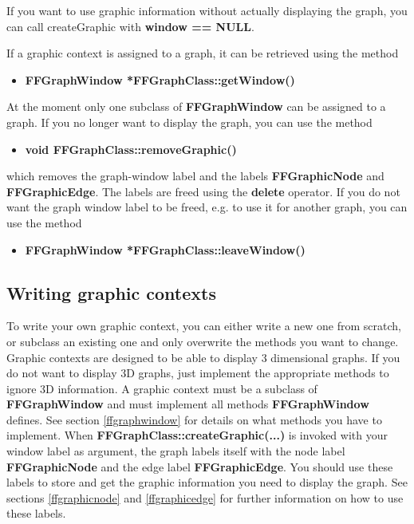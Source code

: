 If you want to use graphic information without actually
displaying the graph, you can call createGraphic with {\bf window
  == NULL}.

If a graphic context is assigned to a graph, it can be retrieved
using the method\\

\begin{itemize}
\item{\bf FFGraphWindow *FFGraphClass::getWindow()}\\
\end{itemize}

At the moment only one subclass of {\bf FFGraphWindow} can be assigned
to a graph. If you no longer want to display the graph, you can use the
method\\

\begin{itemize}
\item{\bf void FFGraphClass::removeGraphic()}\\
\end{itemize}

which removes the graph-window label and the labels {\bf FFGraphicNode}
and {\bf FFGraphicEdge}. The labels are freed using the {\bf delete}
operator. If you do not want the graph window label to be freed, e.g. to
use it for another graph, you can use the method\\

\begin{itemize}
\item{\bf FFGraphWindow *FFGraphClass::leaveWindow()}\\
\end{itemize}

\subsection{Writing graphic contexts}
\label{writing_graphic}

To write your own graphic context, you can either write a new one from
scratch, or subclass an existing one and only overwrite the methods you
want to change. Graphic contexts are designed to be able to display 3
dimensional graphs. If you do not want to display 3D graphs, just
implement the appropriate methods to ignore 3D information.  A graphic
context must be a subclass of {\bf FFGraphWindow} and must implement all
methods {\bf FFGraphWindow} defines.  See section \vref{ffgraphwindow}
for details on what methods you have to implement. When {\bf
  FFGraphClass::createGraphic(...)} is invoked with your window label as
argument, the graph labels itself with the node label {\bf
  FFGraphicNode} and the edge label {\bf FFGraphicEdge}. You should use
these labels to store and get the graphic information you need to
display the graph. See sections \vref{ffgraphicnode} and
\vref{ffgraphicedge} for further information on how to use these labels.

